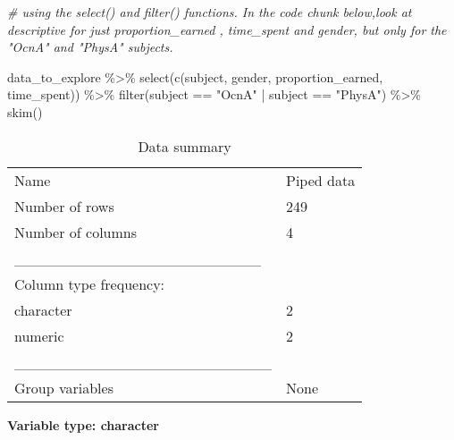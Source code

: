 \documentclass[
]{article}
\newenvironment{Shaded}{\begin{snugshade}}{\end{snugshade}}
\newcommand{\CommentTok}[1]{\textcolor[rgb]{0.56,0.35,0.01}{\textit{#1}}}
\newcommand{\FunctionTok}[1]{\textcolor[rgb]{0.00,0.00,0.00}{#1}}
\newcommand{\NormalTok}[1]{#1}
\newcommand{\SpecialCharTok}[1]{\textcolor[rgb]{0.00,0.00,0.00}{#1}}
\newcommand{\StringTok}[1]{\textcolor[rgb]{0.31,0.60,0.02}{#1}}
\begin{document}
\begin{Shaded}
\begin{Highlighting}[]
\CommentTok{\# using the \textasciigrave{}select()\textasciigrave{} and \textasciigrave{}filter()\textasciigrave{} functions. In the code chunk below,look at descriptive for just \textasciigrave{}proportion\_earned\textasciigrave{} , \textasciigrave{}time\_spent\textasciigrave{} and \textasciigrave{}gender\textasciigrave{}, but only for the "OcnA" and "PhysA" subjects.}

\NormalTok{data\_to\_explore }\SpecialCharTok{\%\textgreater{}\%} 
  \FunctionTok{select}\NormalTok{(}\FunctionTok{c}\NormalTok{(}\StringTok{\textquotesingle{}subject\textquotesingle{}}\NormalTok{, }\StringTok{\textquotesingle{}gender\textquotesingle{}}\NormalTok{, }\StringTok{\textquotesingle{}proportion\_earned\textquotesingle{}}\NormalTok{, }\StringTok{\textquotesingle{}time\_spent\textquotesingle{}}\NormalTok{)) }\SpecialCharTok{\%\textgreater{}\%} 
  \FunctionTok{filter}\NormalTok{(subject }\SpecialCharTok{==} \StringTok{"OcnA"} \SpecialCharTok{|}\NormalTok{ subject }\SpecialCharTok{==} \StringTok{"PhysA"}\NormalTok{) }\SpecialCharTok{\%\textgreater{}\%}
  \FunctionTok{skim}\NormalTok{()}
\end{Highlighting}
\end{Shaded}

\begin{longtable}[]{@{}ll@{}}
\caption{Data summary}\tabularnewline
\toprule
\endhead
Name & Piped data \\
Number of rows & 249 \\
Number of columns & 4 \\
\_\_\_\_\_\_\_\_\_\_\_\_\_\_\_\_\_\_\_\_\_\_\_ & \\
Column type frequency: & \\
character & 2 \\
numeric & 2 \\
\_\_\_\_\_\_\_\_\_\_\_\_\_\_\_\_\_\_\_\_\_\_\_\_ & \\
Group variables & None \\
\bottomrule
\end{longtable}

\textbf{Variable type: character}
\end{document}
